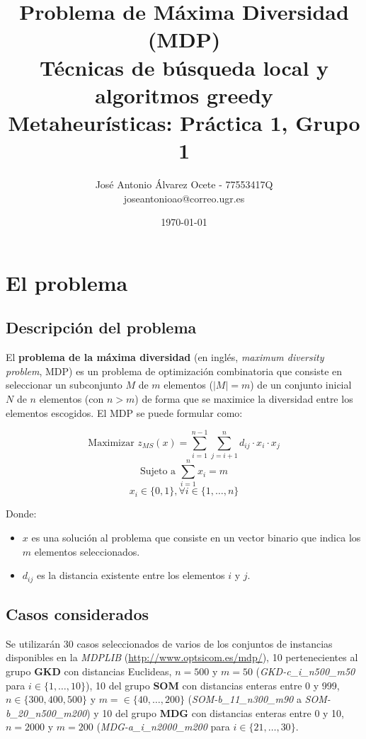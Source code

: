 \documentclass[11pt,a4paper]{article}
\title{Problema de Máxima Diversidad (MDP) 
	\\\medskip \large Técnicas de búsqueda local y algoritmos greedy \\\medskip
	\large Metaheurísticas: Práctica 1, Grupo 1}
\author{José Antonio Álvarez Ocete - 77553417Q \\ joseantonioao@correo.ugr.es}
\date{ \today }
\begin{document}
	
	
	\maketitle 
	\newpage
	\tableofcontents
	\newpage
	
	
	\section{El problema}
	
	\subsection{Descripción del problema}
	
	El \textbf{problema de la máxima diversidad} (en inglés, \emph{maximum diversity problem}, MDP) es un problema de optimización combinatoria que consiste en seleccionar un
	subconjunto $M$ de $m$ elementos ($|M|=m$) de un conjunto inicial $N$ de $n$ elementos (con $n>m$) de forma que se maximice la diversidad entre los elementos escogidos. El MDP se puede formular como:
	
	$$ \text{Maximizar } z_{MS}(x) = \sum_{i=1}^{n-1} \sum_{j=i+1}^{n} d_{ij} \cdot x_i \cdot x_j $$
	$$ \text{Sujeto a } \sum_{i=1}^{n} x_i = m $$
	$$ x_i \in \{0,1\}, \forall i \in \{1,\dotsc,n\} $$
	
	Donde:
	\begin{itemize}
		\item $x$ es una solución al problema que consiste en un vector binario que indica los $m$ elementos seleccionados.
		\item $d_{ij}$ es la distancia existente entre los elementos $i$ y $j$.
		
	\end{itemize}

	\subsection{Casos considerados}
	
	Se utilizarán 30 casos seleccionados de varios de los conjuntos de instancias disponibles en la \emph{MDPLIB} (\url{http://www.optsicom.es/mdp/}), 10 pertenecientes al grupo \textbf{GKD} con distancias Euclideas, $n=500$ y $m=50$ (\emph{GKD-c\_i\_n500\_m50} para $i\in\{1,\dotsc,10\}$), 10 del grupo \textbf{SOM} con distancias enteras entre 0 y 999, $n\in\{300,400,500\}$ y $m=\in\{40,\dotsc,200\}$ (\emph{SOM-b\_11\_n300\_m90} a \emph{SOM-b\_20\_n500\_m200}) y 10 del grupo \textbf{MDG} con distancias enteras entre 0 y 10, $n=2000$ y $m=200$ (\emph{MDG-a\_i\_n2000\_m200} para $i\in\{21,\dotsc,30\}$. \\
	
\end{document}

